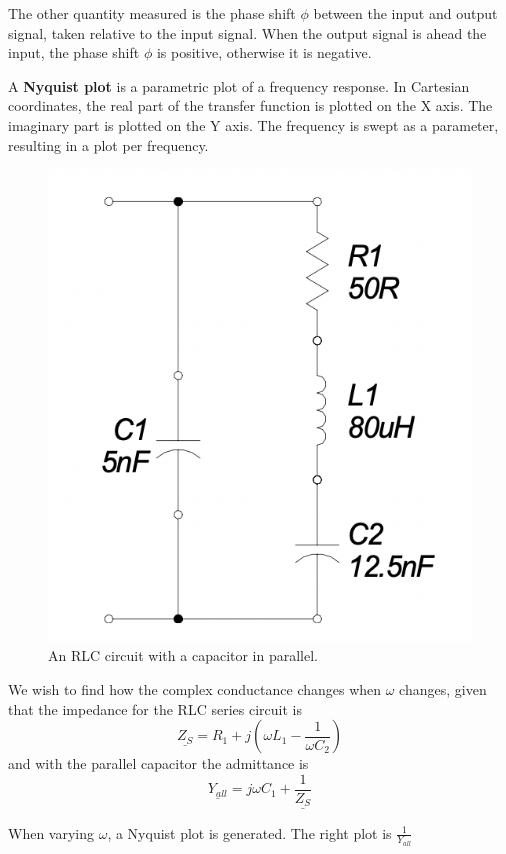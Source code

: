 The other quantity measured is the phase shift $\phi$ between the input and output signal, taken relative to the input signal. When the output signal is ahead the input, the phase shift $\phi$ is positive, otherwise it is negative.


A \textbf{Nyquist plot} is a parametric plot of a frequency response. In Cartesian coordinates, the real part of the transfer function is plotted on the X axis. The imaginary part is
plotted on the Y axis. The frequency is swept as a parameter, resulting in a plot per frequency.

\begin{figure}[H]
    \centering
    \includegraphics[scale=0.5]{images/nyquist_rlc_circuit.png}
    \caption{An RLC circuit with a capacitor in parallel.}
\end{figure}

We wish to find how the complex conductance changes when $\omega$ changes, given that the impedance for the RLC series circuit is
\[\underline{Z_S} = R_1 + j(\omega L_1 - \frac{1}{\omega C_2})\] and with the parallel capacitor the admittance is \[\underline{Y_{all}} = j\omega C_1 + \frac{1}{\underline{Z_S}}\]

When varying $\omega$, a Nyquist plot is generated. The right plot is \(\frac{1}{Y_{all}}\)

